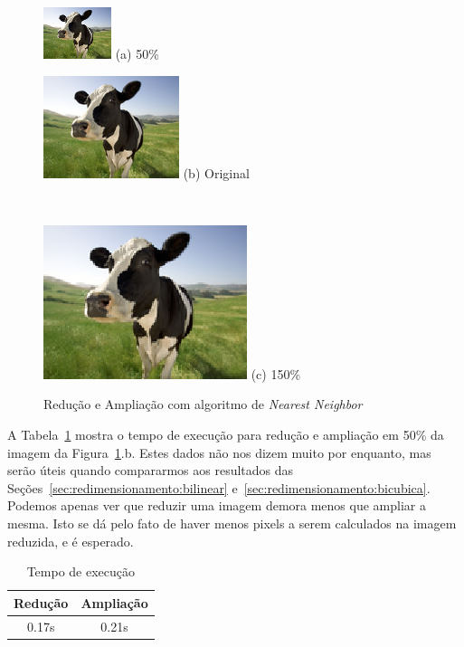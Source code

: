 \documentclass[12pt]{article}
\begin{document}

\begin{figure}[H]
    \begin{minipage}{.2\textwidth}
        \centering
        \includegraphics{cow_nearest_smallest}
        (a) 50\%
    \end{minipage}%
    \begin{minipage}{0.35\textwidth}
        \centering
        \includegraphics{cow_very_small}
        (b) Original
    \end{minipage}~
    \begin{minipage}{0.35\textwidth}
        \centering
        \includegraphics{cow_nearest}
        (c) 150\%
    \end{minipage}
    \caption{Redução e Ampliação com algoritmo de \textit{Nearest Neighbor}}
    \label{fig:vaca:nearest}
\end{figure}

A Tabela~\ref{tab:nearest} mostra o tempo de execução para redução e ampliação em 50\% da imagem da Figura~\ref{fig:vaca:nearest}.b. Estes dados não nos dizem muito por enquanto, mas serão úteis quando compararmos aos resultados das Seções~\ref{sec:redimensionamento:bilinear} e~\ref{sec:redimensionamento:bicubica}. Podemos apenas ver que reduzir uma imagem demora menos que ampliar a mesma. Isto se dá pelo fato de haver menos pixels a serem calculados na imagem reduzida, e é esperado.

\begin{table}[H]
    \caption{Tempo de execução}
    \centering
    \label{tab:nearest}
    \begin{tabular}{c||c}
     Redução & Ampliação \\
     \hline
     0.17s & 0.21s
    \end{tabular}
\end{table}
\end{document}
